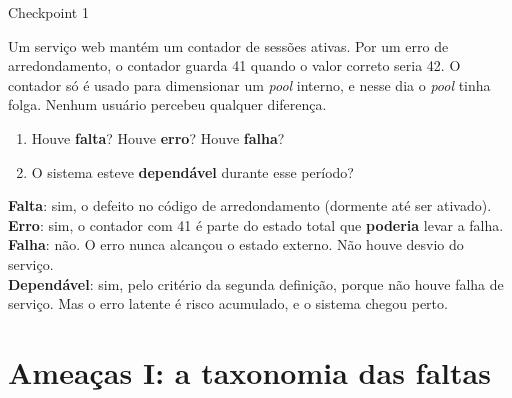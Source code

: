 \documentclass{beamer}
\begin{document}
\begin{frame}{Checkpoint 1}
    \footnotesize
    \begin{checkpoint}
        \scriptsize
        Um servi\c{c}o web mant\'em um contador de sess\~oes ativas. Por um erro de arredondamento, o contador guarda 41 quando o valor correto seria 42. O contador s\'o \'e usado para dimensionar um \textit{pool} interno, e nesse dia o \textit{pool} tinha folga. Nenhum usu\'ario percebeu qualquer diferen\c{c}a.
        \medskip
        \begin{enumerate}
            \item Houve \textbf{falta}? Houve \textbf{erro}? Houve \textbf{falha}?
            \item O sistema esteve \textbf{depend\'avel} durante esse per\'iodo?
        \end{enumerate}
    \end{checkpoint}
    \medskip
    \pause
    \begin{ancora}
        \scriptsize
        \textbf{Falta}: sim, o defeito no c\'odigo de arredondamento (dormente at\'e ser ativado).\\
        \textbf{Erro}: sim, o contador com 41 \'e parte do estado total que \textbf{poderia} levar a falha.\\
        \textbf{Falha}: n\~ao. O erro nunca alcan\c{c}ou o estado externo. N\~ao houve desvio do servi\c{c}o.\\
        \textbf{Depend\'avel}: sim, pelo crit\'erio da segunda defini\c{c}\~ao, porque n\~ao houve falha de servi\c{c}o. Mas o erro latente \'e risco acumulado, e o sistema chegou perto.
    \end{ancora}
\end{frame}

\section{Amea\c{c}as I: a taxonomia das faltas}
\end{document}

